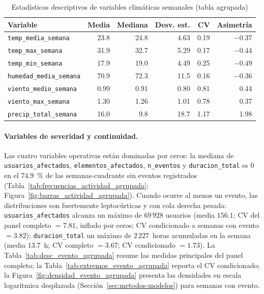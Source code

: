     \begin{table}[!htbp]
    \centering
\small
    \caption{Estadísticos descriptivos de variables climáticas semanales (tabla agrupada)}
    \label{tab:desc_clima_agrupada}
    \begin{tabular}{l r r r r r}
    \toprule
    \textbf{Variable} & \textbf{Media} & \textbf{Mediana} & \textbf{Desv. est.} & \textbf{CV} & \textbf{Asimetría} \\
    \midrule
    \texttt{temp\_media\_semana}    & 23.8  & 24.8 & 4.63  & 0.19 & $-0{.}37$ \\
    \texttt{temp\_max\_semana}      & 31.9  & 32.7 & 5.29  & 0.17 & $-0{.}44$ \\
    \texttt{temp\_min\_semana}      & 17.9  & 19.0 & 4.49  & 0.25 & $-0{.}49$ \\
    \texttt{humedad\_media\_semana} & 70.9  & 72.3 & 11.5  & 0.16 & $-0{.}36$ \\
    \texttt{viento\_medio\_semana}  & 0.99  & 0.91 & 0.80  & 0.81 & 0.44 \\
    \texttt{viento\_max\_semana}    & 1.30  & 1.26 & 1.01  & 0.78 & 0.37 \\
    \texttt{precip\_total\_semana}  & 16.0  & 9.8  & 18.7  & 1.17 & 1.98 \\
    \bottomrule
    \end{tabular}
    \end{table}
    
    
    \paragraph{Variables de severidad y continuidad.} Las cuatro variables operativas están dominadas por ceros: la mediana de \texttt{usuarios\_afectados}, \texttt{elementos\_afectados}, \texttt{n\_eventos} y \texttt{duracion\_total} es $0$ en el $74{.}9$~\% de las semanas-cuadrante sin eventos registrados (Tabla~\ref{tab:frecuencias_actividad_agrupada}; Figura~\ref{fig:barras_actividad_agrupada}). Cuando ocurre al menos un evento, las distribuciones son fuertemente leptocúrticas y con cola derecha pesada: \texttt{usuarios\_afectados} alcanza un máximo de $69\,928$ usuarios (media $156{.}1$; CV del panel completo $= 7{.}81$, inflado por ceros; CV condicionado a semanas con evento $= 3{.}82$); \texttt{duracion\_total} un máximo de $2\,227$~horas acumuladas en la semana (media $13{.}7$~h; CV completo $= 3{.}67$; CV condicionado $= 1{.}73$). La Tabla~\ref{tab:desc_evento_agrupada} resume las medidas principales del panel completo; la Tabla~\ref{tab:extremos_evento_agrupada} reporta el CV condicionado; la Figura~\ref{fig:densidad_evento_agrupada} presenta las densidades en escala logarítmica desplazada (Sección~\ref{sec:metodos-modelos}) para semanas con evento.
    
